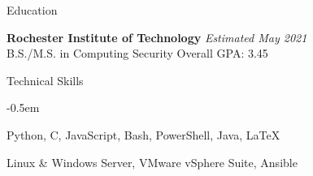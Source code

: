 \documentclass[8pt]{resume} %
\begin{document}

\begin{rSection}{Education}

{\bf Rochester Institute of Technology} \hfill {\em Estimated May 2021} \\ 
B.S./M.S. in Computing Security \hfill Overall GPA: 3.45

\end{rSection}


\begin{rSection}{Technical Skills}

    \begin{multicols}{2}[]

    \begin{description}
        \itemsep -0.5em
        \item[Languages] Python, C, JavaScript, Bash, PowerShell, Java, \LaTeX
        \item[Tools/Software] Linux \& Windows Server, VMware vSphere Suite,
            Ansible
    \end{description}

    \end{multicols}

\end{rSection}

\end{document}
